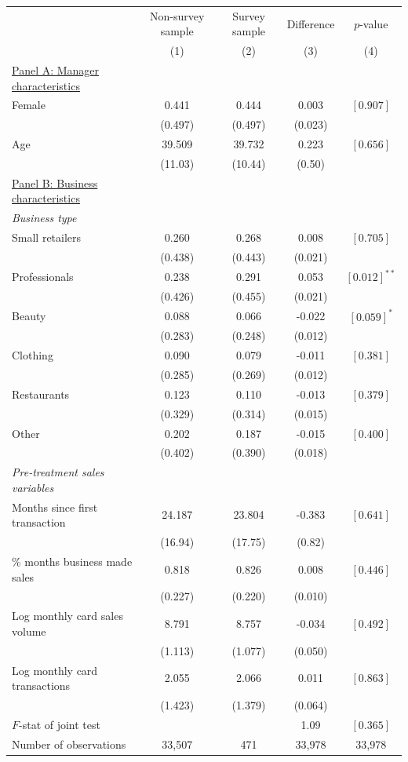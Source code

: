
\begin{tabular}{lcccc}
\toprule
 & Non-survey sample & Survey sample & Difference & $p$-value \\
 & (1) & (2) & (3) & (4)\\
\midrule
\underline{Panel A: Manager characteristics} \\
Female & 0.441 & 0.444 & 0.003 & $[0.907]$\\
 & (0.497) & (0.497) & (0.023) & \\
Age & 39.509 & 39.732 & 0.223 & $[0.656]$\\
 & (11.03) & (10.44) & (0.50) & \\
\underline{Panel B: Business characteristics} \\
\emph{Business type} \\
\quad Small retailers & 0.260 & 0.268 & 0.008 & $[0.705]$\\
 & (0.438) & (0.443) & (0.021) & \\
\quad Professionals & 0.238 & 0.291 & 0.053 & $[0.012]^{**}$\\
 & (0.426) & (0.455) & (0.021) & \\
\quad Beauty & 0.088 & 0.066 & -0.022 & $[0.059]^{*}$\\
 & (0.283) & (0.248) & (0.012) & \\
\quad Clothing & 0.090 & 0.079 & -0.011 & $[0.381]$\\
 & (0.285) & (0.269) & (0.012) & \\
\quad Restaurants & 0.123 & 0.110 & -0.013 & $[0.379]$\\
 & (0.329) & (0.314) & (0.015) & \\
\quad Other & 0.202 & 0.187 & -0.015 & $[0.400]$\\
 & (0.402) & (0.390) & (0.018) & \\
\emph{Pre-treatment sales variables} \\
\quad Months since first transaction & 24.187 & 23.804 & -0.383 & $[0.641]$\\
 & (16.94) & (17.75) & (0.82) & \\
\quad \% months business made sales & 0.818 & 0.826 & 0.008 & $[0.446]$\\
 & (0.227) & (0.220) & (0.010) & \\
\quad Log monthly card sales volume & 8.791 & 8.757 & -0.034 & $[0.492]$\\
 & (1.113) & (1.077) & (0.050) & \\
\quad Log monthly card transactions & 2.055 & 2.066 & 0.011 & $[0.863]$\\
 & (1.423) & (1.379) & (0.064) & \\
\midrule 
 $F$-stat of joint test & & & 1.09 & $[0.365]$  \\
 Number of observations & 33,507 & 471 & 33,978 & 33,978 \\ 
\bottomrule
\end{tabular}
